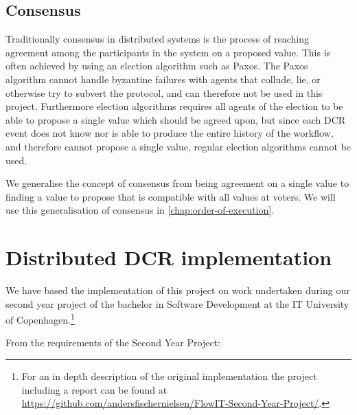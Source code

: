 		
		\subsection{Consensus}
		Traditionally consensus in distributed systems is the process of reaching agreement among the participants in the system on a proposed value. This is often achieved by using an election algorithm such as Paxos\cite{Lamport:1998:PP:279227.279229}. The Paxos algorithm cannot handle byzantine failures with agents that collude, lie, or otherwise try to subvert the protocol, and can therefore not be used in this project. Furthermore election algorithms requires all agents of the election to be able to propose a single value which should be agreed upon, but since each DCR event does not know nor is able to produce the entire history of the workflow, and therefore cannot propose a single value, regular election algorithms cannot be used. 
		
        
        \newpar We generalise the concept of consensus from being agreement on a single value to finding a value to propose that is compatible with all values at voters. We will use this generalisation of consensus in \autoref{chap:order-of-execution}.
		
	\section{Distributed DCR implementation}
		We have based the implementation of this project on work undertaken during our second year project of the bachelor in Software Development at the IT University of Copenhagen.\footnote{For an in depth description of the original implementation the project including a report can be found at \url{https://github.com/andersfischernielsen/FlowIT-Second-Year-Project/}.}
		
		\newpar From the requirements of the Second Year Project:
		
